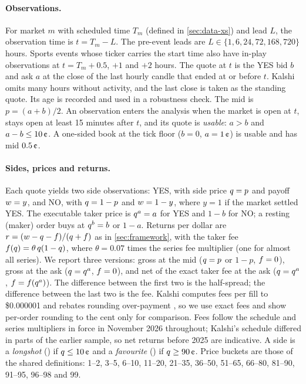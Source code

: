 
\paragraph{Observations.}
For market $m$ with scheduled time $T_m$ (defined in \cref{sec:data-xs}) and lead $L$, the
observation time is $t=T_m-L$. The pre-event leads are $L\in\{1,6,24,72,168,720\}$ hours. Sports
events whose ticker carries the start time also have in-play observations at $t=T_m+0.5$, $+1$
and $+2$ hours. The quote at $t$ is the YES bid $b$ and ask $a$ at the close of the last hourly
candle that ended at or before $t$. Kalshi omits many hours without activity, and the last close is taken
as the standing quote. Its age is recorded and used in a robustness check. The mid is $p=(a+b)/2$.
An observation enters the analysis when the market is open at $t$, stays open at least 15 minutes
after $t$, and its quote is \emph{usable}: $a>b$ and $a-b\le 10\cents$. A one-sided book at the
tick floor ($b=0$, $a=1\cents$) is usable and has mid $0.5\cents$.

\paragraph{Sides, prices and returns.}
Each quote yields two side observations: YES, with side price $q=p$ and payoff $w=y$, and NO,
with $q=1-p$ and $w=1-y$, where $y=1$ if the market settled YES. The executable taker price is
$q^{a}=a$ for YES and $1-b$ for NO; a resting (maker) order buys at $q^{b}=b$ or $1-a$. Returns
per dollar are $r=(w-q-f)/(q+f)$ as in \cref{sec:framework}, with the taker fee
$f(q)=\theta\,q(1-q)$, where $\theta=0.07$ times the series fee multiplier (one for almost all
series). We report three versions:
gross at the mid ($q=p$ or $1-p$, $f=0$), gross at the ask ($q=q^a$, $f=0$), and net of the
exact taker fee at the ask ($q=q^a$, $f=f(q^a)$). The difference between the first two is the
half-spread; the difference between the last two is the fee. Kalshi computes fees per fill to
\$0.000001 and rebates rounding over-payment \citep{kalshirounding}, so we use exact fees and show
per-order rounding to the cent only for comparison. Fees follow the schedule and
series multipliers in force in November 2026 throughout; Kalshi's schedule differed in parts of the
earlier sample, so net returns before 2025 are indicative. A side is a
\emph{longshot} (\LS) if $\q\le 10\cents$ and a \emph{favourite} (\FAV) if $\q\ge 90\cents$. Price
buckets are those of the shared definitions: 1--2, 3--5, 6--10, 11--20, 21--35, 36--50, 51--65, 66--80,
81--90, 91--95, 96--98\cents{} and 99\cents.


